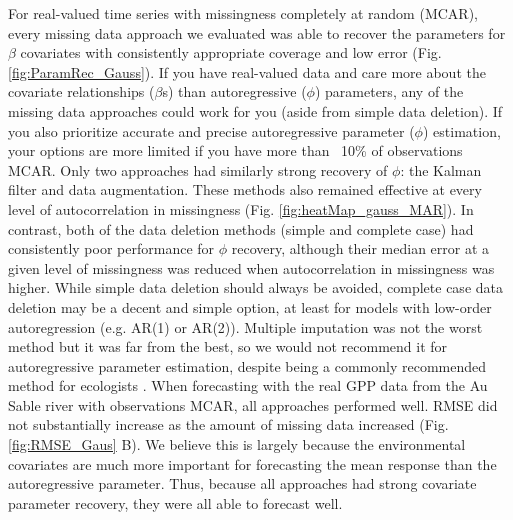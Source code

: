 \documentclass{article}
\begin{document}


For real-valued time series with missingness completely at random (MCAR), every missing data approach we evaluated was able to recover the parameters for $\beta$ covariates with consistently appropriate coverage and low error (Fig. \ref{fig:ParamRec_Gauss}). If you have real-valued data and care more about the covariate relationships ($\beta$s) than autoregressive ($\phi$) parameters, any of the missing data approaches could work for you (aside from simple data deletion). If you also prioritize accurate and precise autoregressive parameter ($\phi$) estimation, your options are more limited if you have more than ~10\% of observations MCAR. Only two approaches had similarly strong recovery of $\phi$: the Kalman filter and data augmentation. These methods also remained effective at every level of autocorrelation in missingness (Fig. \ref{fig:heatMap_gauss_MAR}). In contrast, both of the data deletion methods (simple and complete case) had consistently poor performance for $\phi$ recovery, although their median error at a given level of missingness was reduced when autocorrelation in missingness was higher. While simple data deletion should always be avoided, complete case data deletion may be a decent and simple option, at least for models with low-order autoregression (e.g. AR(1) or AR(2)). Multiple imputation was not the worst method but it was far from the best, so we would not recommend it for autoregressive parameter estimation, despite being a commonly recommended method for ecologists \citep{nakagawa_missing_2008,ellington_using_2015}.  When forecasting with the real GPP data from the Au Sable river with observations MCAR, all approaches performed well. RMSE did not substantially increase as the amount of missing data increased (Fig. \ref{fig:RMSE_Gaus} B). We believe this is largely because the environmental covariates are much more important for forecasting the mean response than the autoregressive parameter. Thus, because all approaches had strong covariate parameter recovery, they were all able to forecast well.
\end{document}
